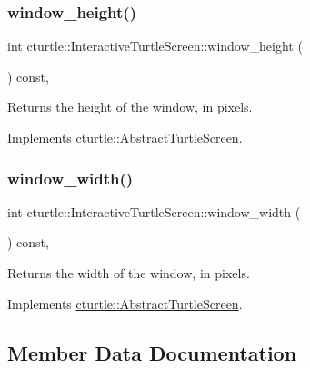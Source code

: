 \subsubsection{\texorpdfstring{window\+\_\+height()}{window\_height()}}
{\footnotesize\ttfamily int cturtle\+::\+Interactive\+Turtle\+Screen\+::window\+\_\+height (\begin{DoxyParamCaption}{ }\end{DoxyParamCaption}) const\hspace{0.3cm}{\ttfamily [inline]}, {\ttfamily [virtual]}}

Returns the height of the window, in pixels. 

Implements \hyperlink{classcturtle_1_1AbstractTurtleScreen}{cturtle\+::\+Abstract\+Turtle\+Screen}.

\mbox{\label{classcturtle_1_1InteractiveTurtleScreen_aefeb4e90fae07d043677f3dee9a29026}} 
\subsubsection{\texorpdfstring{window\+\_\+width()}{window\_width()}}
{\footnotesize\ttfamily int cturtle\+::\+Interactive\+Turtle\+Screen\+::window\+\_\+width (\begin{DoxyParamCaption}{ }\end{DoxyParamCaption}) const\hspace{0.3cm}{\ttfamily [inline]}, {\ttfamily [virtual]}}

Returns the width of the window, in pixels. 

Implements \hyperlink{classcturtle_1_1AbstractTurtleScreen}{cturtle\+::\+Abstract\+Turtle\+Screen}.



\subsection{Member Data Documentation}
\mbox{\label{classcturtle_1_1InteractiveTurtleScreen_a3cc73fa2f1e0f2579a5bc1917396e023}} 
